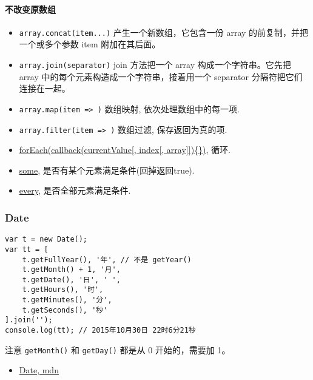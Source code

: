 \paragraph{不改变原数组}\label{ux4e0dux6539ux53d8ux539fux6570ux7ec4}

\begin{itemize}
\tightlist
\item
  \lstinline!array.concat(item...)! 产生一个新数组，它包含一份 array
  的前复制，并把一个或多个参数 item 附加在其后面。
\item
  \lstinline!array.join(separator)! join 方法把一个 array
  构成一个字符串。它先把 array 中的每个元素构造成一个字符串，接着用一个
  separator 分隔符把它们连接在一起。
\item
  \lstinline!array.map(item => )! 数组映射, 依次处理数组中的每一项.
\item
  \lstinline!array.filter(item => )! 数组过滤, 保存返回为真的项.
\item
  \href{https://developer.mozilla.org/en-US/docs/Web/JavaScript/Reference/Global_Objects/Array/forEach}{forEach(callback(currentValue{[},
  index{[}, array{]}{]})\{\})}, 循环.
\item
  \href{https://developer.mozilla.org/en-US/docs/Web/JavaScript/Reference/Global_Objects/Array/some}{some},
  是否有某个元素满足条件(回掉返回true).
\item
  \href{https://developer.mozilla.org/en-US/docs/Web/JavaScript/Reference/Global_Objects/Array/every}{every},
  是否全部元素满足条件.
\end{itemize}

\subsubsection{Date}\label{date}

\begin{lstlisting}
var t = new Date();
var tt = [
    t.getFullYear(), '年', // 不是 getYear()
    t.getMonth() + 1, '月',
    t.getDate(), '日', ' ',
    t.getHours(), '时',
    t.getMinutes(), '分',
    t.getSeconds(), '秒'
].join('');
console.log(tt); // 2015年10月30日 22时6分21秒
\end{lstlisting}

注意 \lstinline!getMonth()! 和 \lstinline!getDay()! 都是从 0
开始的，需要加 1。

\begin{itemize}
\tightlist
\item
  \href{https://developer.mozilla.org/en-US/docs/Web/JavaScript/Reference/Global_Objects/Date}{Date,
  mdn}
\end{itemize}

